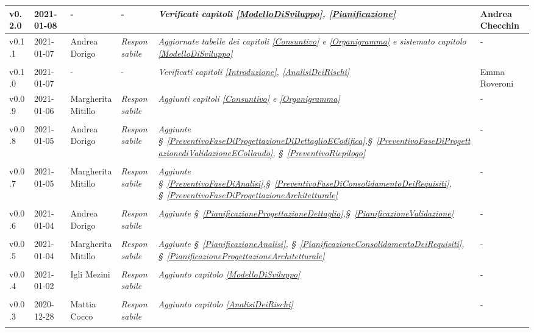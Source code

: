 {\begin{center}
\begin{longtable}[c]{|p{2cm-1\tabcolsep}|p{2cm}|p{3cm-2\tabcolsep}|p{}|p{}|p{4cm-2\tabcolsep}|}
		\hline
		\centering v0.2.0 & 2021-01-08 & \centering - & \centering - & \textit{Verificati capitoli \ref{ModelloDiSviluppo}, \ref{Pianificazione}} & Andrea Checchin  \\ 
		\hline
		\centering v0.1.1 & 2021-01-07 & Andrea Dorigo & \centering \textit{Responsabile} & \textit{Aggiornate tabelle dei capitoli \ref{Consuntivo} e \ref{Organigramma} e sistemato capitolo \ref{ModelloDiSviluppo}} & \centering -  \\ \tabularnewline
		\hline
		\centering v0.1.0 & 2021-01-07 & \centering - & \centering - & 	\textit{Verificati capitoli \ref{Introduzione}, \ref{AnalisiDeiRischi} } & Emma Roveroni  \\ 
		\hline
		\centering v0.0.9 & 2021-01-06 & Margherita Mitillo & \centering \textit{Responsabile} & \textit{Aggiunti capitoli \ref{Consuntivo} e \ref{Organigramma}} & \centering -  \\ \tabularnewline
		\hline
		\centering v0.0.8 & 2021-01-05 & Andrea Dorigo & \centering \textit{Responsabile}  & \textit{Aggiunte \S~\ref{PreventivoFaseDiProgettazioneDiDettaglioECodifica},\S~\ref{PreventivoFaseDiProgettazionediValidazioneECollaudo}, \S~\ref{PreventivoRiepilogo} } & \centering -  \\ \tabularnewline
		\hline
		\centering v0.0.7 & 2021-01-05 & Margherita Mitillo & \centering \textit{Responsabile} & \textit{Aggiunte \S~\ref{PreventivoFaseDiAnalisi},\S~\ref{PreventivoFaseDiConsolidamentoDeiRequisiti}, \S~\ref{PreventivoFaseDiProgettazioneArchitetturale} } & \centering -  \\ \tabularnewline
		\hline
		\centering v0.0.6 & 2021-01-04 & Andrea Dorigo & \centering \textit{Responsabile} & \textit{Aggiunte \S~\ref{PianificazioneProgettazioneDettaglio},\S~\ref{PianificazioneValidazione}} & \centering -  \\ \tabularnewline
		\hline
		\centering v0.0.5 & 2021-01-04 & Margherita Mitillo & \centering \textit{Responsabile} & \textit{Aggiunte  \S~\ref{PianificazioneAnalisi}, \S~\ref{PianificazioneConsolidamentoDeiRequisiti}, \S~\ref{PianificazioneProgettazioneArchitetturale}} & \centering -  \\ \tabularnewline
		\hline
		\centering v0.0.4 & 2021-01-02 & Igli Mezini & \centering \textit{Responsabile} & \textit{Aggiunto capitolo \ref{ModelloDiSviluppo}} & \centering -  \\ \tabularnewline
		\hline
		\centering v0.0.3 & 2020-12-28 & Mattia Cocco & \centering \textit{Responsabile} & \textit{Aggiunto capitolo \ref{AnalisiDeiRischi} } & \centering -  \\ \tabularnewline

\end{longtable}
\end{center}}
